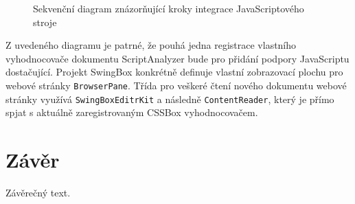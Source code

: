\begin{figure}[H]
  \begin{center}
    \caption{Sekvenční diagram znázorňující kroky integrace JavaScriptového stroje}
    \label{Figure.SwingBoxIntegrationDesign}
  \end{center}
\end{figure}

Z uvedeného diagramu je patrné, že pouhá jedna registrace vlastního vyhodnocovače dokumentu ScriptAnalyzer bude pro přidání podpory JavaScriptu dostačující. Projekt SwingBox konkrétně definuje vlastní zobrazovací plochu pro webové stránky \texttt{BrowserPane}. Třída pro veškeré čtení nového dokumentu webové stránky využívá \texttt{SwingBoxEditrKit} a následně \texttt{ContentReader}, který je přímo spjat s aktuálně zaregistrovaným CSSBox vyhodnocovačem.

\chapter{Závěr}
\label{Chapter.Final}
Závěrečný text.